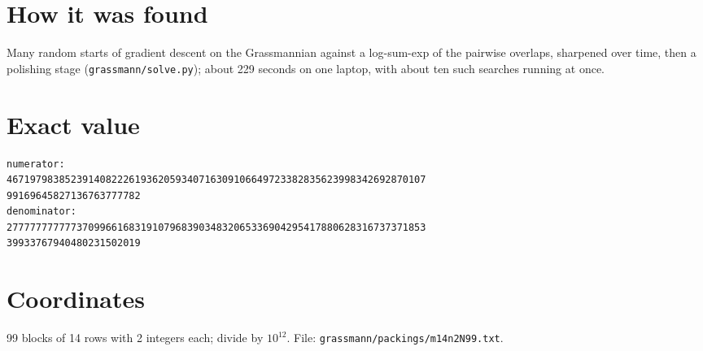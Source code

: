 \documentclass[11pt,a4paper]{article}
\begin{document}
\section{How it was found}
Many random starts of gradient descent on the Grassmannian against a log-sum-exp of the pairwise overlaps, sharpened over time, then a polishing stage (\texttt{grassmann/solve.py}); about 229 seconds on one laptop, with about ten such searches running at once.


\appendix
\section{Exact value}
{\small
\begin{verbatim}
numerator:
467197983852391408222619362059340716309106649723382835623998342692870107
99169645827136763777782
denominator:
277777777777370996616831910796839034832065336904295417880628316737371853
39933767940480231502019
\end{verbatim}}

\section{Coordinates}
99 blocks of 14 rows with 2 integers each; divide by $10^{12}$. File: \texttt{grassmann/packings/m14n2N99.txt}.
{\tiny
\begin{multicols}{4}
\end{multicols}}
\end{document}

